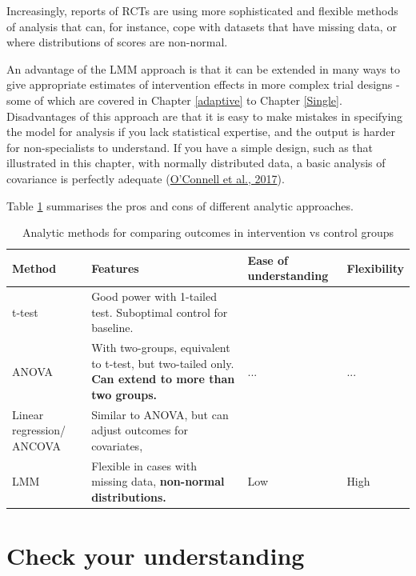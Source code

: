 \documentclass{krantz}
\begin{document}
Increasingly, reports of RCTs are using more sophisticated and flexible methods of analysis that can, for instance, cope with datasets that have missing data, or where distributions of scores are non-normal.

An advantage of the LMM approach is that it can be extended in many ways to give appropriate estimates of intervention effects in more complex trial designs - some of which are covered in Chapter \ref{adaptive} to Chapter \ref{Single}. Disadvantages of this approach are that it is easy to make mistakes in specifying the model for analysis if you lack statistical expertise, and the output is harder for non-specialists to understand. If you have a simple design, such as that illustrated in this chapter, with normally distributed data, a basic analysis of covariance is perfectly adequate (\protect\hyperlink{ref-oconnell2017}{O'Connell et al., 2017}).

Table \ref{tab:table-procon} summarises the pros and cons of different analytic approaches.

\begin{table}[H]

\caption{\label{tab:table-procon}Analytic methods for comparing outcomes in intervention vs control groups}
\centering
\begin{tabular}[t]{>{\centering\arraybackslash}p{7em}>{\centering\arraybackslash}p{12em}>{\centering\arraybackslash}p{7em}>{\centering\arraybackslash}p{7em}}
\toprule
Method & Features & Ease of understanding & Flexibility\\
\midrule
t-test & Good power with 1-tailed test. 
Suboptimal control for baseline. 
\textbf{\cellcolor{gray!6}{Assumes normality.}} & \cellcolor{gray!6}{High} & \cellcolor{gray!6}{Low}\\
ANOVA & With two-groups, equivalent to t-test, 
but two-tailed only. 
\textbf{Can extend to more than two groups.} & ... & ...\\
Linear regression/ ANCOVA & Similar to ANOVA, but can adjust 
outcomes for covariates, 
\textbf{\cellcolor{gray!6}{including baseline.}} & \cellcolor{gray!6}{...} & \cellcolor{gray!6}{...}\\
LMM & Flexible in cases with missing data, 
\textbf{non-normal distributions.} & Low & High\\
\bottomrule
\end{tabular}
\end{table}

\hypertarget{check-your-understanding-11}{%
\section{Check your understanding}\label{check-your-understanding-11}}
\end{document}
